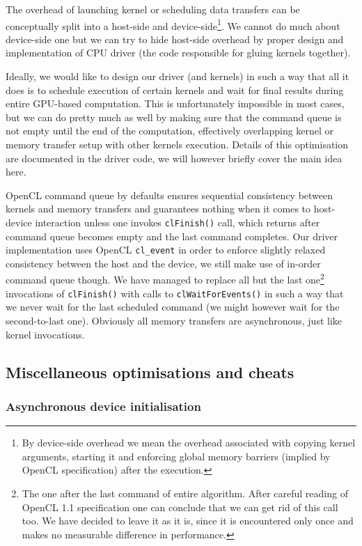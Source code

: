 The overhead of launching kernel or scheduling data transfers can be conceptually split into a host-side and device-side\footnote{By device-side overhead we mean the overhead associated with copying kernel arguments, starting it and enforcing global memory barriers (implied by OpenCL specification) after the execution.}.
We cannot do much about device-side one but we can try to hide host-side overhead by proper design and implementation of CPU driver (the code responsible for gluing kernels together).

Ideally, we would like to design our driver (and kernels) in such a way that all it does is to schedule execution of certain kernels and wait for final results during entire GPU-based computation.
This is unfortunately impossible in most cases, but we can do pretty much as well by making sure that the command queue is not empty until the end of the computation, effectively overlapping kernel or memory transfer setup with other kernels execution.
Details of this optimisation are documented in the driver code, we will however briefly cover the main idea here.

OpenCL command queue by defaults ensures sequential consistency between kernels and memory transfers and guarantees nothing when it comes to host-device interaction unless one invokes \verb+clFinish()+ call, which returns after command queue becomes empty and the last command completes.
Our driver implementation uses OpenCL \verb+cl_event+ in order to enforce slightly relaxed consistency between the host and the device, we still make use of in-order command queue though.
We have managed to replace all but the last one\footnote{The one after the last command of entire algorithm. After careful reading of OpenCL 1.1 specification one can conclude that we can get rid of this call too. We have decided to leave it as it is, since it is encountered only once and makes no measurable difference in performance.} invocations of \verb+clFinish()+ with calls to \verb+clWaitForEvents()+ in such a way that we never wait for the last scheduled command (we might however wait for the second-to-last one).
Obviously all memory transfers are asynchronous, just like kernel invocations.

\subsection*{Miscellaneous optimisations and cheats}

\subsubsection*{Asynchronous device initialisation}

